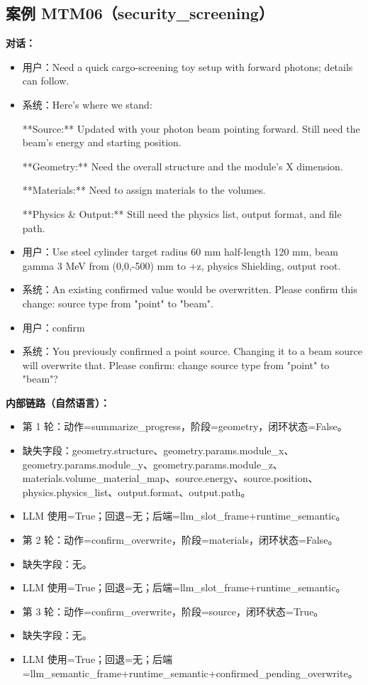 \documentclass[11pt]{ctexart}
\begin{document}
\subsection{案例 MTM06（security\_screening）}
\textbf{对话：}
\begin{itemize}
\item 用户：Need a quick cargo-screening toy setup with forward photons; details can follow.
\item 系统：Here's where we stand:

**Source:** Updated with your photon beam pointing forward. Still need the beam's energy and starting position.

**Geometry:** Need the overall structure and the module's X dimension.

**Materials:** Need to assign materials to the volumes.

**Physics \& Output:** Still need the physics list, output format, and file path.
\item 用户：Use steel cylinder target radius 60 mm half-length 120 mm, beam gamma 3 MeV from (0,0,-500) mm to +z, physics Shielding, output root.
\item 系统：An existing confirmed value would be overwritten. Please confirm this change: source type from "point" to "beam".
\item 用户：confirm
\item 系统：You previously confirmed a point source. Changing it to a beam source will overwrite that. Please confirm: change source type from "point" to "beam"?
\end{itemize}
\textbf{内部链路（自然语言）：}
\begin{itemize}
\item 第 1 轮：动作=summarize\_progress，阶段=geometry，闭环状态=False。
\item 缺失字段：geometry.structure、geometry.params.module\_x、geometry.params.module\_y、geometry.params.module\_z、materials.volume\_material\_map、source.energy、source.position、physics.physics\_list、output.format、output.path。
\item LLM 使用=True；回退=无；后端=llm\_slot\_frame+runtime\_semantic。
\item 第 2 轮：动作=confirm\_overwrite，阶段=materials，闭环状态=False。
\item 缺失字段：无。
\item LLM 使用=True；回退=无；后端=llm\_slot\_frame+runtime\_semantic。
\item 第 3 轮：动作=confirm\_overwrite，阶段=source，闭环状态=True。
\item 缺失字段：无。
\item LLM 使用=True；回退=无；后端=llm\_semantic\_frame+runtime\_semantic+confirmed\_pending\_overwrite。
\end{itemize}
\end{document}
